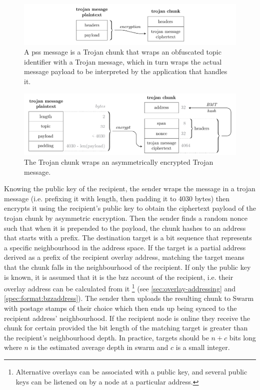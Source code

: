 \begin{figure}[htbp]
\centering
\includegraphics[width=\textwidth]{fig/trojan-generic.pdf}
\caption[Trojan chunk or pss message\statusgreen]{A pss message is a Trojan chunk that wraps an obfuscated topic identifier with a Trojan message, which in turn wraps the actual message payload to be interpreted by the application that handles it.}
\label{fig:trojan-generic}
\end{figure}

\begin{figure}[htbp]
\centering
\includegraphics[width=\textwidth]{fig/trojan-chunk-3.pdf}
\caption[Trojan chunk\statusgreen]{The Trojan chunk wraps an asymmetrically encrypted Trojan message.}
\label{fig:trojan-chunk}
\end{figure}

Knowing the public key of the recipient, the sender wraps the message in a trojan message (i.e. prefixing it with length, then padding it to 4030 bytes) then encrypts it using the recipient's public key to obtain the ciphertext payload of the trojan chunk by asymmetric encryption. Then the sender finds a random nonce such that when it is prepended to the payload, the chunk hashes to an address that starts with a  prefix. The destination target is a bit sequence that represents a specific neighbourhood in the address space. If the target is a partial address derived as a prefix of the recipient overlay address, matching the target means that the chunk falls in the neighbourhood of the recipient. If only the public key is known, it is assumed that it is the bzz account of the recipient, i.e. their overlay address can be calculated from it%
%
\footnote{Alternative overlays can be associated with a public key, and several public keys can be listened on by a node at a particular address.}
%
(see \ref{sec:overlay-addressing} and \ref{spec:format:bzzaddress}). The sender then uploads the resulting chunk to Swarm with postage stamps of their choice which then ends up being synced to the recipient address' neighbourhood. If the recipient node is online they receive the chunk for certain provided the bit length of the matching target is greater than the recipient's neighbourhood depth. In practice, targets should be $n+c$ bits long where $n$ is the estimated average depth in swarm and $c$ is a small integer. 


